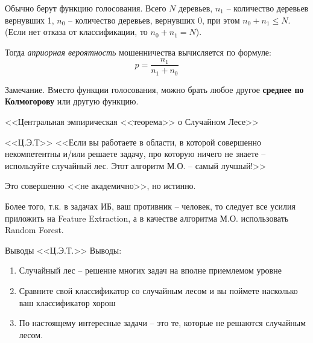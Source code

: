 \documentclass{beamer}
\newcommand{\term}{\textit}
\begin{document}
\begin{frame}
	Обычно берут функцию голосования. 
	Всего $N$ деревьев, 
	$n_1$ -- количество деревьев вернувших 1,
	$n_0$ -- количество деревьев, вернувших 0,
	при этом $n_0 + n_1 \leqslant N$. 
	(Если нет отказа от классификации, то $n_0 + n_1 = N$).
	
	Тогда \term{априорная вероятность} мошенничества
	вычисляется по формуле:
	\begin{equation}
	p = \frac{n_1}{n_1+n_0}
	\end{equation}
	
	\begin{block}{Замечание.}
	Вместо функции голосования, можно брать любое другое 
	\textbf{среднее по Колмогорову} или другую функцию.
	\end{block}
\end{frame}

\begin{frame}{<<Центральная эмпирическая <<теорема>> о Случайном Лесе>>}
	\begin{block}{<<Ц.Э.Т>>}
	<<Если вы работаете в области,
	в которой совершенно некомпетентны
	и/или решаете задачу, про которую ничего не знаете --
	используйте случайный лес.
	Этот алгоритм М.О. -- самый лучшый!>>
	\end{block}
	Это совершенно <<не академично>>, но истинно.
	
	Более того, т.к. в задачах ИБ, ваш противник --
	человек, то следует все усилия приложить на 
	Feature Extraction, а в качестве алгоритма М.О.
	использовать Random Forest. 
\end{frame}

\begin{frame}{Выводы <<Ц.Э.Т.>>}
	Выводы: 
	\begin{enumerate}
	\item Случайный лес -- решение многих 
	задач на вполне приемлемом уровне
	\item Сравните свой классификатор со случайным лесом 
	и вы поймете насколько ваш классификатор хорош
	\item По настоящему интересные задачи -- это те,
	которые не решаются случайным лесом.
	\end{enumerate}
\end{frame}
\end{document}
